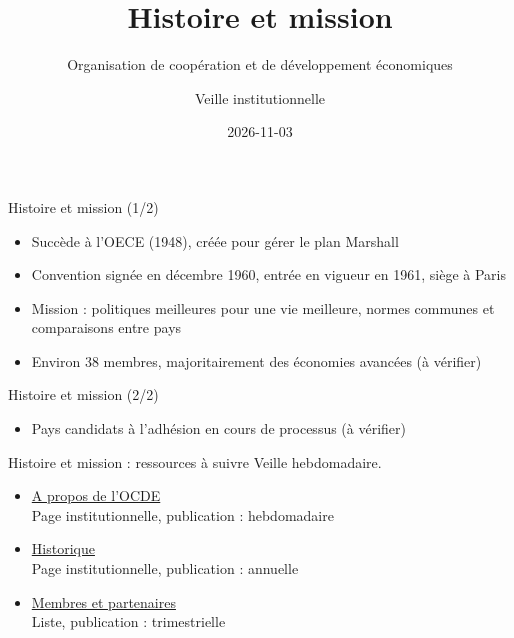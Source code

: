 \documentclass[aspectratio=169,11pt]{beamer}
\title{Histoire et mission}
\subtitle{Organisation de coopération et de développement économiques}
\author{Veille institutionnelle}
\date{2026-11-03}
\begin{document}
\begin{frame}\titlepage\end{frame}

\begin{frame}{Histoire et mission (1/2)}
\begin{itemize}
\item Succède à l'OECE (1948), créée pour gérer le plan Marshall
\item Convention signée en décembre 1960, entrée en vigueur en 1961, siège à Paris
\item Mission : politiques meilleures pour une vie meilleure, normes communes et comparaisons entre pays
\item Environ 38 membres, majoritairement des économies avancées (à vérifier)
\end{itemize}
\end{frame}

\begin{frame}{Histoire et mission (2/2)}
\begin{itemize}
\item Pays candidats à l'adhésion en cours de processus (à vérifier)
\end{itemize}
\end{frame}

\begin{frame}{Histoire et mission : ressources à suivre}
\small
Veille hebdomadaire.
\begin{itemize}
\item \href{https://www.oecd.org/en/about.html}{A propos de l'OCDE}\\{\footnotesize Page institutionnelle, publication : hebdomadaire}
\item \href{https://www.oecd.org/en/about/history.html}{Historique}\\{\footnotesize Page institutionnelle, publication : annuelle}
\item \href{https://www.oecd.org/en/about/members-partners.html}{Membres et partenaires}\\{\footnotesize Liste, publication : trimestrielle}
\end{itemize}
\end{frame}
\end{document}
